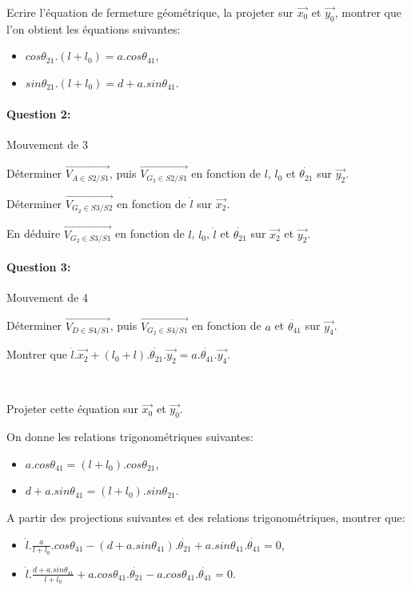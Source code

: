 Ecrire l'équation de fermeture géométrique, la projeter sur $\overrightarrow{x_0}$ et $\overrightarrow{y_0}$, montrer que l'on obtient les équations suivantes:
\begin{itemize}
 \item $cos\theta_{21}.(l+l_0)=a.cos\theta_{41}$,
 \item $sin\theta_{21}.(l+l_0)=d+a.sin\theta_{41}$.
\end{itemize}

\paragraph{Question 2:} Mouvement de 3

Déterminer $\overrightarrow{V_{A \in S2/S1}}$, puis $\overrightarrow{V_{G_2 \in S2/S1}}$ en fonction de $l$, $l_0$ et $\dot{\theta_{21}}$ sur $\overrightarrow{y_2}$.

Déterminer $\overrightarrow{V_{G_2 \in S3/S2}}$ en fonction de $\dot{l}$ sur $\overrightarrow{x_2}$.

En déduire $\overrightarrow{V_{G_2 \in S3/S1}}$ en fonction de $l$, $l_0$, $\dot{l}$ et $\dot{\theta_{21}}$ sur $\overrightarrow{x_2}$ et $\overrightarrow{y_2}$.

\paragraph{Question 3:} Mouvement de 4

Déterminer $\overrightarrow{V_{D \in S4/S1}}$, puis $\overrightarrow{V_{G_2 \in S4/S1}}$ en fonction de $a$ et $\dot{\theta_{41}}$ sur $\overrightarrow{y_4}$.

Montrer que $\dot{l}.\overrightarrow{x_2}+(l_0+l).\dot{\theta_{21}}.\overrightarrow{y_2}=a.\dot{\theta_{41}}.\overrightarrow{y_4}$.

~\

Projeter cette équation sur $\overrightarrow{x_0}$ et $\overrightarrow{y_0}$.

On donne les relations trigonométriques suivantes:
\begin{itemize}
 \item $a.cos\theta_{41}=(l+l_0).cos\theta_{21}$,
 \item $d+a.sin\theta_{41}=(l+l_0).sin\theta_{21}$.
\end{itemize}

A partir des projections suivantes et des relations trigonométriques, montrer que:
\begin{itemize}
 \item $\dot{l}.\frac{a}{l+l_0}.cos\theta_{41}-(d+a.sin\theta_{41}).\dot{\theta_{21}}+a.sin\theta_{41}.\dot{\theta_{41}}=0$,
 \item $\dot{l}.\frac{d+a.sin\theta_{41}}{l+l_0}+a.cos\theta_{41}.\dot{\theta_{21}}-a.cos\theta_{41}.\dot{\theta_{41}}=0$.
\end{itemize}

